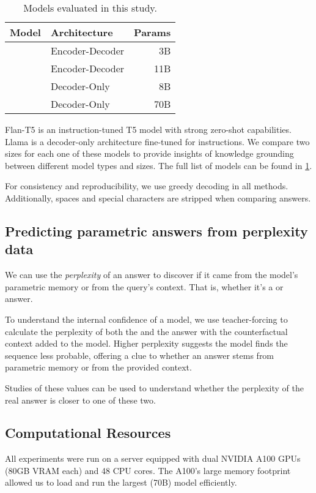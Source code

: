 \begin{table}[b]
	\centering
	\small
	\renewcommand{\arraystretch}{1.2}
	\begin{tabularx}{\columnwidth}{X l r}
		\toprule
			Model             & Architecture    & Params \\
		\midrule
			\smallflan{}      & Encoder-Decoder & 3B          \\[5pt]
			\bigflan{}        & Encoder-Decoder & 11B         \\[5pt]
			\llamaparbox{}    & Decoder-Only    & 8B          \\[10pt]
			\bigllamaparbox{} & Decoder-Only    & 70B         \\[10pt]
		\bottomrule
	\end{tabularx}
	\caption{Models evaluated in this study.}
	\label{models}
\end{table}

Flan-T5 \citep{flant5} is an instruction-tuned T5 model \citep{t5} with strong zero-shot capabilities.
Llama \citep{llama3} is a decoder-only architecture fine-tuned for instructions.
We compare two sizes for each one of these models to provide insights of knowledge grounding between different model types and sizes.
The full list of models can be found in \cref{models}.

For consistency and reproducibility, we use greedy decoding in all methods.
Additionally, spaces and special characters are stripped when comparing answers.

\subsection{Predicting parametric answers from perplexity data}
We can use the \emph{perplexity} of an answer to discover if it came from the model's parametric memory or from the query's context.
That is, whether it's a \Parametric{} or \Contextual{} answer.

To understand the internal confidence of a model, we use teacher-forcing to calculate the perplexity of both the \Parametric{} and the \Contextual{} answer with the counterfactual context added to the model.
Higher perplexity suggests the model finds the sequence less probable, offering a clue to whether an answer stems from parametric memory or from the provided context.

Studies of these values can be used to understand whether the perplexity of the real answer is closer to one of these two.

\subsection{Computational Resources}
All experiments were run on a server equipped with dual NVIDIA A100 GPUs (80GB VRAM each) and 48 CPU cores.
The A100’s large memory footprint allowed us to load and run the largest (70B) model efficiently.
